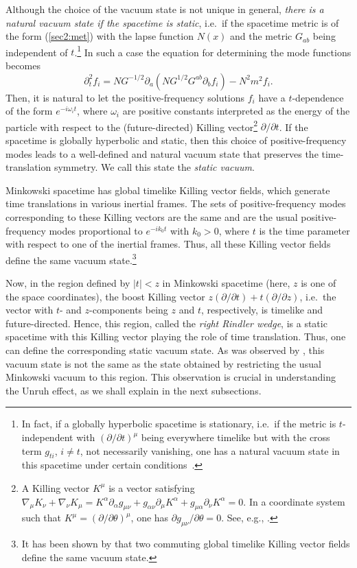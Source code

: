 \documentclass[12pt,nofootinbib,floatfix,aps,prd,showpacs,amsmath,amssymb,eqsecnum]{revtex4-2}
\begin{document}
Although the choice of the vacuum state is not 
unique in general, 
{\em there is a natural vacuum state if the spacetime is static}, 
i.e.~if the spacetime 
metric is of the form (\ref{sec2:met}) with the lapse function $N(x)$ 
and the metric $G_{ab}$ being independent of $t$.\footnote{In fact, if a
globally hyperbolic 
spacetime is stationary, i.e.~if the metric is $t$-independent with
$(\partial/\partial t)^\mu$ being everywhere timelike but with
the cross term $g_{ti}$, $i\neq t$, not necessarily vanishing, one has a
natural vacuum state in this spacetime under certain
conditions~\cite{Ashtekaretal75,Kay78}.}
In such a case the 
equation for determining the mode functions becomes
\begin{equation}
\partial_t^2 f_i = 
NG^{-1/2}\partial_a (N G^{1/2}G^{ab} \partial_b f_i) - N^2 m^2 f_i.
\label{sec2:t-indepeq}
\end{equation}
Then, it is natural to let the positive-frequency solutions 
$f_i$ have a $t$-dependence of the form $e^{-i\omega_i t}$,
where $\omega_i$ are positive constants interpreted as the energy of the
particle with respect to the (future-directed) 
Killing vector\footnote{A Killing vector 
$K^\mu$ is a vector satisfying
$\nabla_\mu K_\nu + \nabla_\nu K_\mu = K^\alpha\partial_\alpha
g_{\mu\nu} + g_{\alpha\nu}\partial_\mu K^\alpha +
g_{\mu\alpha}\partial_\nu K^\alpha = 0$.  In a coordinate system such
that $K^\mu = (\partial/\partial\theta)^\mu$, one has
$\partial g_{\mu\nu}/\partial\theta = 0$. See, e.g., 
\textcite{Waldbook84}.} 
$\partial/\partial t$.
If the spacetime is globally hyperbolic
and static, then this choice of
positive-frequency modes leads to a well-defined and natural 
vacuum state that preserves the time-translation symmetry.  We call this
state the {\em static vacuum}.

Minkowski spacetime has global timelike Killing vector fields, 
which generate
time translations in various inertial frames.  The sets of
positive-frequency modes corresponding to these Killing vectors are the
same and are the usual positive-frequency modes proportional to
$e^{-ik_0 t}$ with $k_0 > 0$, where $t$ is the time parameter with
respect to one of the inertial frames.  Thus, all these Killing vector
fields define the same vacuum state.\footnote{It has been shown by
\textcite{Chmielowski94} that two commuting 
global timelike Killing vector fields define the same vacuum state.}

Now, in the region defined by $|t|<z$ 
in Minkowski spacetime
(here, $z$ is one of the space coordinates), the
boost Killing vector $z(\partial/\partial t) + t(\partial/\partial z)$,
i.e.~the vector with
$t$- and $z$-components being $z$ and $t$, respectively,
is timelike and future-directed.  Hence, this region,
called the {\em right Rindler wedge}, is a static spacetime with this
Killing vector playing the role of time translation. 
Thus, one can define the corresponding static vacuum state.  
As was observed by
\textcite{Fulling73}, this vacuum state is not the same as the state
obtained by restricting the usual Minkowski vacuum to this region.  
This observation is
crucial in understanding the Unruh effect, as we shall explain in the
next subsections.
\end{document}
